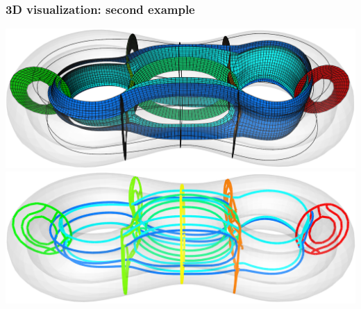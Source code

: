 \documentclass[12pt]{beamer}
\begin{document}
\begin{frame}[fragile]
  \frametitle{3D visualization: second example}
  \includegraphics[height=0.5\textheight]{./images/vis-3d-ex2-sheets.png}
  \includegraphics[height=0.5\textheight]{./images/vis-3d-ex2-curves.png}
\end{frame}

\end{document}
